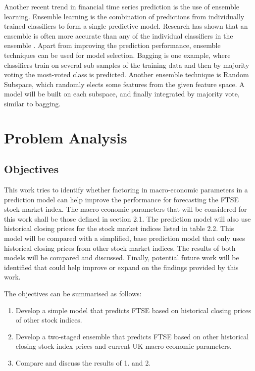 \documentclass{UoYCSproject}
\begin{document}
Another recent trend in financial time series prediction is the use of ensemble learning. Ensemble learning is the combination of predictions from individually trained classifiers to form a single predictive model. Research has shown that an ensemble is often more accurate than any of the individual classifiers in the ensemble \cite{opitz1999popular}. Apart from improving the prediction performance, ensemble techniques can be used for model selection. Bagging \cite{breiman1996bagging} is one example, where classifiers train on several sub samples of the training data and then by majority voting the most-voted class is predicted. Another ensemble technique is Random Subspace, which randomly elects some features from the given feature space. A model will be built on each subspace, and finally integrated by majority vote, similar to bagging. 

\chapter{Problem Analysis}
\section{Objectives}
This work tries to identify whether factoring in macro-economic parameters in a prediction model can help improve the performance for forecasting the FTSE stock market index.  The macro-economic parameters that will be considered for this work shall be those defined in section 2.1. The prediction model will also use historical closing prices for the stock market indices listed in table 2.2. This model will be compared with a simplified, base prediction model that only uses historical closing prices from other stock market indices. The results of both models will be compared and discussed. Finally, potential future work will be identified that could help improve or expand on the findings provided by this work.

The objectives can be summarised as follows:
\begin{enumerate}
    \item Develop a simple model that predicts FTSE based on historical closing prices of other stock indices.
    \item Develop a two-staged ensemble that predicts FTSE based on other historical closing stock index prices and current UK macro-economic parameters.
    \item Compare and discuss the results of 1. and 2. 
\end{enumerate}
\end{document}
